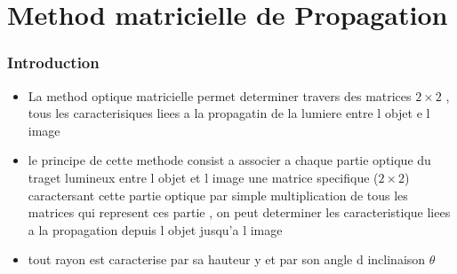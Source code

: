 \documentclass[12pt]{book}
\begin{document}
    \chapter{Method matricielle de Propagation }
        \subsection{Introduction}
            \begin{itemize}
                \item La method optique matricielle permet determiner travers des matrices $2 \times 2$ , tous les caracterisiques liees a la propagatin de la lumiere entre l objet e l image
                \item le principe de cette methode consist a associer a chaque partie optique du traget lumineux entre l objet et l image une matrice specifique ($2 \times 2$) caractersant cette partie optique par simple multiplication de tous les matrices qui represent ces partie , on peut determiner les caracteristique liees a la propagation depuis l objet jusqu'a l image 
                \item tout rayon est caracterise par sa hauteur y et par son angle d inclinaison $\theta$ 
                  
            \end{itemize}
\end{document}
